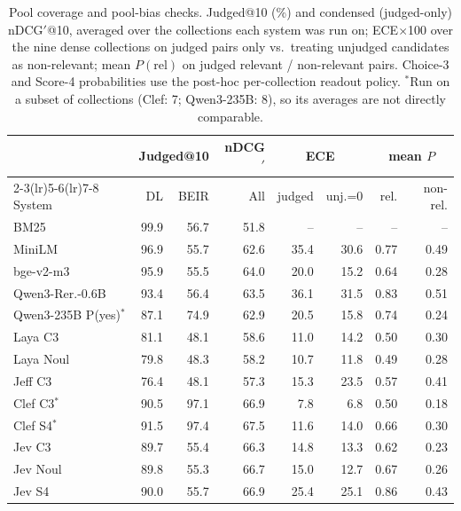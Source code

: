 \begin{table}[tp]
\centering
\scriptsize
\setlength{\tabcolsep}{2.5pt}
\caption{Pool coverage and pool-bias checks. Judged@10 (\%) and condensed (judged-only) nDCG$'$@10, averaged over the collections each system was run on; ECE$\times$100 over the nine dense collections on judged pairs only vs.\ treating unjudged candidates as non-relevant; mean $P(\text{rel})$ on judged relevant / non-relevant pairs. Choice-3 and Score-4 probabilities use the post-hoc per-collection readout policy. $^\ast$Run on a subset of collections (Clef: 7; Qwen3-235B: 8), so its averages are not directly comparable.}
\label{tab:judged}
\begin{tabular}{lrrrrrrr}
\toprule
 & \multicolumn{2}{c}{Judged@10} & nDCG$'$ & \multicolumn{2}{c}{ECE} & \multicolumn{2}{c}{mean $P$} \\
\cmidrule(lr){2-3}\cmidrule(lr){5-6}\cmidrule(lr){7-8}
System & DL & BEIR & All & judged & unj.=0 & rel. & non-rel. \\
\midrule
BM25 & 99.9 & 56.7 & 51.8 & -- & -- & -- & -- \\
MiniLM & 96.9 & 55.7 & 62.6 & 35.4 & 30.6 & 0.77 & 0.49 \\
bge-v2-m3 & 95.9 & 55.5 & 64.0 & 20.0 & 15.2 & 0.64 & 0.28 \\
Qwen3-Rer.-0.6B & 93.4 & 56.4 & 63.5 & 36.1 & 31.5 & 0.83 & 0.51 \\
Qwen3-235B P(yes)$^\ast$ & 87.1 & 74.9 & 62.9 & 20.5 & 15.8 & 0.74 & 0.24 \\
Laya C3 & 81.1 & 48.1 & 58.6 & 11.0 & 14.2 & 0.50 & 0.30 \\
Laya Noul & 79.8 & 48.3 & 58.2 & 10.7 & 11.8 & 0.49 & 0.28 \\
Jeff C3 & 76.4 & 48.1 & 57.3 & 15.3 & 23.5 & 0.57 & 0.41 \\
Clef C3$^\ast$ & 90.5 & 97.1 & 66.9 & 7.8 & 6.8 & 0.50 & 0.18 \\
Clef S4$^\ast$ & 91.5 & 97.4 & 67.5 & 11.6 & 14.0 & 0.66 & 0.30 \\
Jev C3 & 89.7 & 55.4 & 66.3 & 14.8 & 13.3 & 0.62 & 0.23 \\
Jev Noul & 89.8 & 55.3 & 66.7 & 15.0 & 12.7 & 0.67 & 0.26 \\
Jev S4 & 90.0 & 55.7 & 66.9 & 25.4 & 25.1 & 0.86 & 0.43 \\
\bottomrule
\end{tabular}
\end{table}